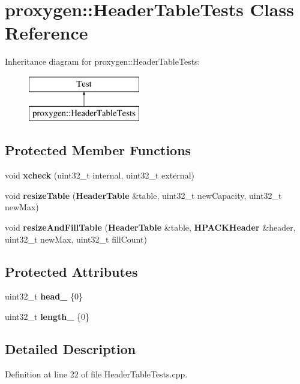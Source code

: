 \section{proxygen\+:\+:Header\+Table\+Tests Class Reference}
\label{classproxygen_1_1HeaderTableTests}
Inheritance diagram for proxygen\+:\+:Header\+Table\+Tests\+:\begin{figure}[H]
\begin{center}
\leavevmode
\includegraphics[height=2.000000cm]{classproxygen_1_1HeaderTableTests}
\end{center}
\end{figure}
\subsection*{Protected Member Functions}
\begin{DoxyCompactItemize}
\item 
void {\bf xcheck} (uint32\+\_\+t internal, uint32\+\_\+t external)
\item 
void {\bf resize\+Table} ({\bf Header\+Table} \&table, uint32\+\_\+t new\+Capacity, uint32\+\_\+t new\+Max)
\item 
void {\bf resize\+And\+Fill\+Table} ({\bf Header\+Table} \&table, {\bf H\+P\+A\+C\+K\+Header} \&header, uint32\+\_\+t new\+Max, uint32\+\_\+t fill\+Count)
\end{DoxyCompactItemize}
\subsection*{Protected Attributes}
\begin{DoxyCompactItemize}
\item 
uint32\+\_\+t {\bf head\+\_\+} \{0\}
\item 
uint32\+\_\+t {\bf length\+\_\+} \{0\}
\end{DoxyCompactItemize}


\subsection{Detailed Description}


Definition at line 22 of file Header\+Table\+Tests.\+cpp.



